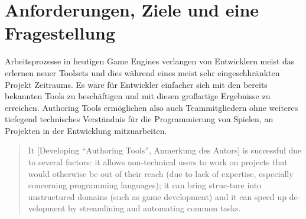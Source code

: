 \documentclass[pagesize, paper=a4, fontsize=12pt,titlepage=true, headings=small, headnosepline, abstractoff, liststotoc, nochapterprefix, plainheadsepline, twoside]{scrreprt}
\begin{document}
\begingroup
	\clearpage
	\pagestyle{empty}
	\tableofcontents
	\clearpage
\endgroup
\newpage
\thispagestyle{empty}
\mbox{}


\renewcommand*{\chapterpagestyle}{plain}
\pagestyle{plain}
\setcounter{page}{0}

\chapter{Anforderungen, Ziele und eine Fragestellung}
Arbeitsprozesse in heutigen Game Engines verlangen von Entwicklern meist das erlernen neuer Toolsets und dies während eines meist sehr eingeschhränkten Projekt Zeitraums. Es wäre für Entwickler einfacher sich mit den bereits bekannten Tools zu beschäftigen und mit diesen großartige Ergebnisse zu erreichen. Authoring Tools ermöglichen  also auch Teammitgliedern ohne weiteres tiefegend technisches Verständnis für die Programmierung von Spielen, an Projekten in der Entwicklung mitzuarbeiten.

\begin{quote}
It [Developing “Authoring Tools”, Anmerkung des Autors] is successful due to several factors: it allows non-technical users to work on projects that would otherwise be out of their reach (due to lack of expertise, especially concerning programming languages); it can bring struc-ture into unstructured domains (such as game development) and it can speed up de-velopment by streamlining and automating common tasks. \cite {FutureTrendsGAT:2012}
\end{quote}
\end{document}
